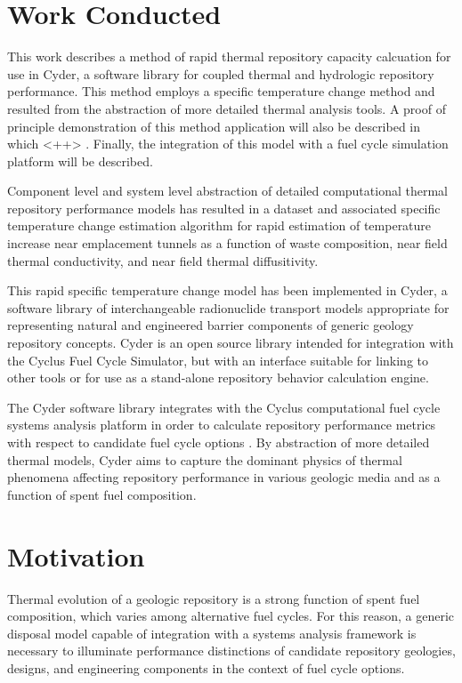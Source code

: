 \documentclass[letterpaper]{article}
\begin{document}
\section{Work Conducted}

This work describes a method of rapid thermal repository capacity calcuation for 
use in Cyder, a software library for coupled thermal and hydrologic repository 
performance. This method employs a specific temperature change method and 
resulted from the abstraction of more detailed thermal analysis tools. A proof 
of principle demonstration of this method application will also be described in 
which <++> .
Finally, the integration of this model with a fuel cycle simulation platform will be described.

Component level and system level abstraction of detailed computational thermal 
repository performance models has resulted in a dataset and associated specific 
temperature change estimation algorithm for rapid estimation of temperature 
increase near emplacement tunnels as a function of waste composition,
near field thermal conductivity, and near field thermal diffusitivity. 

This rapid specific temperature change model has been implemented in Cyder, 
a software library of interchangeable 
radionuclide transport models appropriate for representing natural and 
engineered barrier components of generic geology repository concepts.
Cyder is an open source library intended for integration with the 
Cyclus Fuel Cycle Simulator, but with an interface suitable for linking to other 
tools or for use as a stand-alone repository behavior calculation engine. 

The Cyder software library integrates with 
the Cyclus computational fuel cycle systems analysis platform in order to 
calculate repository performance metrics with respect to candidate fuel cycle 
options \cite{huff_cyder_2012,huff_cyclus:_2010}. By abstraction of more 
detailed thermal models, Cyder aims to capture the dominant 
physics of thermal phenomena affecting repository performance in 
various geologic media and as a function of spent fuel composition.

\section{Motivation}
Thermal evolution of a geologic repository is a strong function 
of spent fuel composition, which varies among alternative fuel cycles. For this 
reason, a generic disposal model capable of integration with a systems analysis 
framework is necessary to illuminate performance distinctions of candidate 
repository geologies, designs, and engineering components in the context of fuel 
cycle options. 
\end{document}
